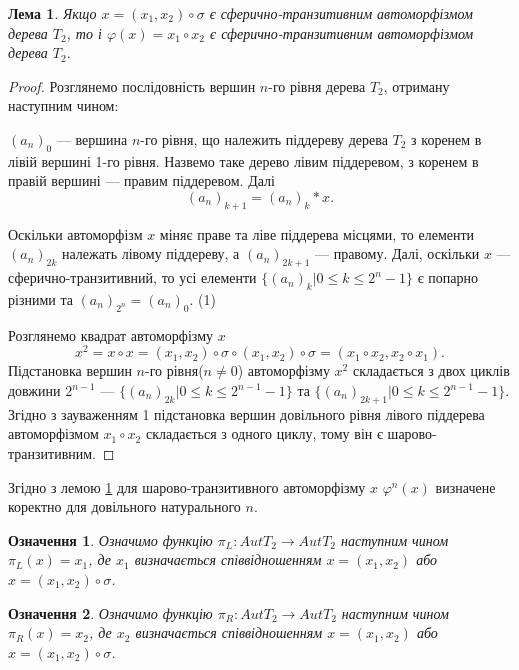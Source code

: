 \documentclass[a4paper,12pt]{article} \usepackage{a4wide}
\numberwithin{equation}{subsection}
\newtheorem{lemma}{Лема}[subsection]
\newtheorem{definition}{Означення}[subsection]
\begin{document}
\begin{lemma}\label{varphi_sph_transitive}Якщо $x=(x_1,x_2)\circ\sigma$
є сферично-транзитивним автоморфізмом дерева $T_2$, то і $\varphi (x) = x_1\circ
x_2$ є сферично-транзитивним автоморфізмом дерева $T_2$.
\end{lemma}
\begin{proof}
Розглянемо послідовність вершин $n$-го рівня дерева $T_2$, отриману наступним чином:

$(a_n)_0$ --- вершина $n$-го рівня, що належить піддереву дерева $T_2$ з коренем в лівій вершині 1-го рівня. Назвемо таке дерево лівим піддеревом, з коренем в правій вершині --- правим піддеревом. Далі
$$(a_n)_{k+1} = (a_n)_k*x.$$

Оскільки автоморфізм $x$ міняє праве та ліве піддерева місцями, то елементи $(a_n)_{2k}$ належать лівому піддереву, а $(a_n)_{2k+1}$ --- правому.
Далі, оскільки $x$ --- сферично-транзитивний, то усі елементи $\{(a_n)_{k} | 0 \leq k \leq 2^n-1\}$ є попарно різними та $(a_n)_{2^n} = (a_n)_0$. (1)

Розглянемо квадрат  автоморфізму $x$
 $$x^2 = x\circ x = (x_1,x_2)\circ\sigma \circ (x_1,x_2)\circ\sigma = (x_1\circ x_2, x_2\circ x_1 ).$$
 Підстановка вершин $n$-го рівня($n\neq 0$) автоморфізму $x^2$ складається з двох циклів довжини $2^{n-1}$ --- $\{(a_n)_{2k} | 0 \leq k \leq 2^{n-1}-1\}$ та $\{(a_n)_{2k+1} | 0 \leq k \leq 2^{n-1}-1\}$. Згідно з зауваженням 1 підстановка вершин довільного рівня лівого піддерева автоморфізмом $x_1\circ x_2$ складається з одного циклу, тому він є шарово-транзитивним.
\end{proof}

Згідно з лемою \ref{varphi_sph_transitive} для шарово-транзитивного автоморфізму $x$ $\varphi^n(x)$ визначене коректно для довільного натурального $n$.

\begin{definition}
    Означимо функцію $\pi_L:AutT_2\rightarrow AutT_2$ наступним чином
    $\pi_L (x)=x_1$, де $x_1$ визначається співвідношенням
    $x=(x_1,x_2)$ або $x=(x_1,x_2)\circ\sigma$.
  \end{definition}

  \begin{definition}
    Означимо функцію $\pi_R:AutT_2\rightarrow AutT_2$ наступним чином
    $\pi_R (x)=x_2$, де $x_2$ визначається співвідношенням
    $x=(x_1,x_2)$ або $x=(x_1,x_2)\circ\sigma$.
  \end{definition}
\end{document}
